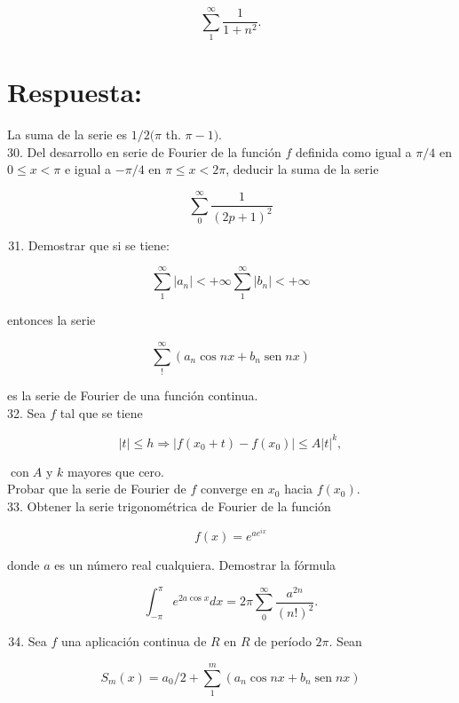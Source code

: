 \documentclass[10pt]{article}
\theoremstyle{plain}
\theoremstyle{definition}
\theoremstyle{remark}
\begin{document}
$$
\sum_{1}^{\infty} \frac{1}{1+n^{2}} .
$$

\section*{Respuesta:}
La suma de la serie es $1 / 2(\pi$ th. $\pi-1)$.\\
30. Del desarrollo en serie de Fourier de la función $f$ definida como igual a $\pi / 4$ en $0 \leqslant x<\pi$ e igual a $-\pi / 4$ en $\pi \leqslant x<2 \pi$, deducir la suma de la serie

$$
\sum_{0}^{\infty} \frac{1}{(2 p+1)^{2}}
$$

\begin{enumerate}
  \setcounter{enumi}{30}
  \item Demostrar que si se tiene:
\end{enumerate}

$$
\sum_{1}^{\infty}\left|a_{n}\right|<+\infty \sum_{1}^{\infty}\left|b_{n}\right|<+\infty
$$

entonces la serie

$$
\sum_{!}^{\infty}\left(a_{n} \cos n x+b_{n} \operatorname{sen} n x\right)
$$

es la serie de Fourier de una función continua.\\
32. Sea $f$ tal que se tiene

$$
|t| \leqslant h \Rightarrow\left|f\left(x_{0}+t\right)-f\left(x_{0}\right)\right| \leqslant A|t|^{k},
$$

$\operatorname{con} A$ y $k$ mayores que cero.\\
Probar que la serie de Fourier de $f$ converge en $x_{0}$ hacia $f\left(x_{0}\right)$.\\
33. Obtener la serie trigonométrica de Fourier de la función

$$
f(x)=e^{a e^{i x}}
$$

donde $a$ es un número real cualquiera. Demostrar la fórmula

$$
\int_{-\pi}^{\pi} e^{2 a \cos x} d x=2 \pi \sum_{0}^{\infty} \frac{a^{2 n}}{(n!)^{2}} .
$$

\begin{enumerate}
  \setcounter{enumi}{33}
  \item Sea $f$ una aplicación continua de $R$ en $R$ de período $2 \pi$. Sean
\end{enumerate}

$$
S_{m}(x)=a_{0} / 2+\sum_{1}^{m}\left(a_{n} \cos n x+b_{n} \operatorname{sen} n x\right)
$$
\end{document}
